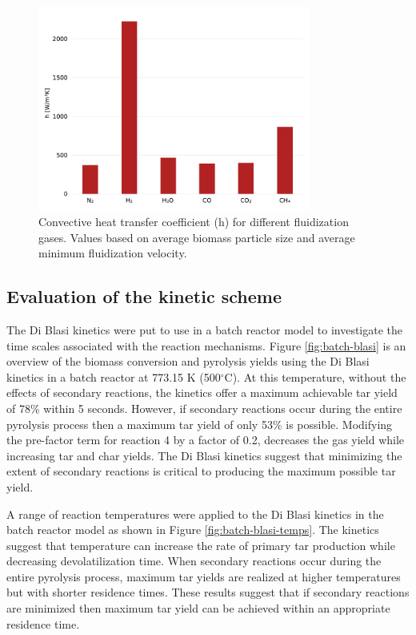 \begin{figure}[H]
    \centering
    \includegraphics[width=0.8\textwidth]{figures/biomass_hconv.pdf}
    \caption{Convective heat transfer coefficient (h) for different fluidization gases. Values based on average biomass particle size and average minimum fluidization velocity.}
    \label{fig:biomass-hconv}
\end{figure}


\subsection{Evaluation of the kinetic scheme}

The Di Blasi kinetics were put to use in a batch reactor model to investigate the time scales associated with the reaction mechanisms. Figure \ref{fig:batch-blasi} is an overview of the biomass conversion and pyrolysis yields using the Di Blasi kinetics in a batch reactor at 773.15 K (500$^\circ$C). At this temperature, without the effects of secondary reactions, the kinetics offer a maximum achievable tar yield of 78\% within 5 seconds. However, if secondary reactions occur during the entire pyrolysis process then a maximum tar yield of only 53\% is possible. Modifying the pre-factor term for reaction 4 by a factor of 0.2, decreases the gas yield while increasing tar and char yields. The Di Blasi kinetics suggest that minimizing the extent of secondary reactions is critical to producing the maximum possible tar yield.

A range of reaction temperatures were applied to the Di Blasi kinetics in the batch reactor model as shown in Figure \ref{fig:batch-blasi-temps}. The kinetics suggest that temperature can increase the rate of primary tar production while decreasing devolatilization time. When secondary reactions occur during the entire pyrolysis process, maximum tar yields are realized at higher temperatures but with shorter residence times. These results suggest that if secondary reactions are minimized then maximum tar yield can be achieved within an appropriate residence time.


